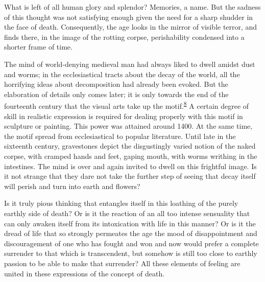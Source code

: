 What is left of all human glory and splendor? Memories, a name. But the
sadness of this thought was not satisfying enough given the need for a
sharp shudder in the face of death. Consequently, the age looks in the
mirror of visible terror, and finds there, in the image of the rotting
corpse, perishability condensed into a shorter frame of time.

The mind of world-denying medieval man had always liked to dwell amidst
dust and worms; in the ecclesiastical tracts about the decay of the
world, all the horrifying ideas about decomposition had already been
evoked. But the elaboration of details only comes later; it is only
towards the end of the fourteenth century that the visual arts take up
the
motif.\textsuperscript{\protect\hypertarget{12_Chapter_Five__THE_VISION_OF_DEAT.xhtmlux5cux23id_1335}{\protect\hyperlink{23_NOTES.xhtmlux5cux23id_1336}{8}}}
A certain degree of skill in realistic expression is required for
dealing properly with this motif in sculpture or painting. This power
was attained around 1400. At the same time, the motif spread from
ecclesiastical to popular literature. Until late in the sixteenth
century, gravestones depict the disgustingly varied notion of the naked
corpse, with cramped hands and feet, gaping mouth, with worms writhing
in the intestines. The mind is over and again invited to dwell on this
frightful image. Is it not strange that they dare not take the further
step of seeing that decay itself will perish and turn into earth and
flowers?

Is it truly pious thinking that entangles itself in this loathing of the
purely earthly side of death? Or is it the reaction of an all too
intense sensuality that can only awaken itself from its intoxication
with life in this manner? Or is it the dread of life that so strongly
permeates the age the mood of disappointment and discouragement of one
who has fought and won and now would prefer a complete surrender to that
which is transcendent, but somehow is still too close to earthly passion
to be able to make that surrender? All these elements of feeling are
united in these expressions of the concept of death.

